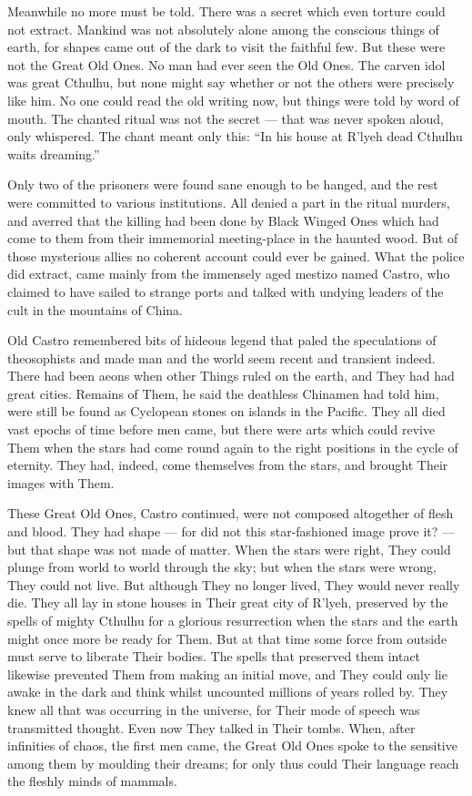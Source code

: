 \begin{pages}
\begin{Leftside}
Meanwhile no more must be told. There was a secret which even torture
could not extract. Mankind was not absolutely alone among the conscious
things of earth, for shapes came out of the dark to visit the faithful
few. But these were not the Great Old Ones. No man had ever seen the Old
Ones. The carven idol was great Cthulhu, but none might say whether or
not the others were precisely like him. No one could read the old
writing now, but things were told by word of mouth. The chanted ritual
was not the secret --- that was never spoken aloud, only whispered. The
chant meant only this: ``In his house at R'lyeh dead Cthulhu waits
dreaming.''

Only two of the prisoners were found sane enough to be hanged, and the
rest were committed to various institutions. All denied a part in the
ritual murders, and averred that the killing had been done by Black
Winged Ones which had come to them from their immemorial meeting-place
in the haunted wood. But of those mysterious allies no coherent account
could ever be gained. What the police did extract, came mainly from the
immensely aged mestizo named Castro, who claimed to have sailed to
strange ports and talked with undying leaders of the cult in the
mountains of China.

Old Castro remembered bits of hideous legend that paled the speculations
of theosophists and made man and the world seem recent and transient
indeed. There had been aeons when other Things ruled on the earth, and
They had had great cities. Remains of Them, he said the deathless
Chinamen had told him, were still be found as Cyclopean stones on
islands in the Pacific. They all died vast epochs of time before men
came, but there were arts which could revive Them when the stars had
come round again to the right positions in the cycle of eternity. They
had, indeed, come themselves from the stars, and brought Their images
with Them.

These Great Old Ones, Castro continued, were not composed altogether of
flesh and blood. They had shape --- for did not this star-fashioned image
prove it? --- but that shape was not made of matter. When the stars were
right, They could plunge from world to world through the sky; but when
the stars were wrong, They could not live. But although They no longer
lived, They would never really die. They all lay in stone houses in
Their great city of R'lyeh, preserved by the spells of mighty Cthulhu
for a glorious resurrection when the stars and the earth might once more
be ready for Them. But at that time some force from outside must serve
to liberate Their bodies. The spells that preserved them intact likewise
prevented Them from making an initial move, and They could only lie
awake in the dark and think whilst uncounted millions of years rolled
by. They knew all that was occurring in the universe, for Their mode of
speech was transmitted thought. Even now They talked in Their tombs.
When, after infinities of chaos, the first men came, the Great Old Ones
spoke to the sensitive among them by moulding their dreams; for only
thus could Their language reach the fleshly minds of mammals.


\end{Leftside}
\end{pages}
